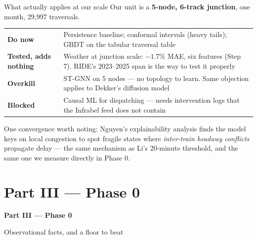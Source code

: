 \documentclass[aspectratio=169,10pt]{beamer}
\newcommand{\srcnote}[1]{{\scriptsize\color{ink3}#1}}
\begin{document}
\begin{frame}{What actually applies at our scale}
  Our unit is a \textbf{5-node, 6-track junction}, one month, 29{,}997 traversals.

  \vspace{0.8em}
  \centering
  \begin{tabular}{@{}p{4.1cm}p{8.3cm}@{}}
    \toprule
    \textbf{Do now} & Persistence baseline; conformal intervals (heavy tails);
      GBDT on the tabular traversal table \\
    \addlinespace
    \textbf{Tested, adds nothing} & Weather at junction scale: $-1.7\%$ MAE, six features
      (Step 7). RIDE's 2023--2025 span is the way to test it properly \\
    \addlinespace
    \textbf{Overkill} & ST-GNN on 5 nodes --- no topology to learn. Same objection applies to
      Dekker's diffusion model \\
    \addlinespace
    \textbf{Blocked} & Causal ML for dispatching --- needs intervention logs that the
      Infrabel feed does not contain \\
    \bottomrule
  \end{tabular}

  \vspace{1.2em}
  \raggedright
  \srcnote{One convergence worth noting: Nguyen's explainability analysis finds the model
  keys on local congestion to spot fragile states where \emph{inter-train headway conflicts}
  propagate delay --- the same mechanism as Li's 20-minute threshold, and the same one we
  measure directly in Phase 0.}
\end{frame}

\section{Part III --- Phase 0}
\begin{frame}[plain]
  \begin{center}\Large\textbf{Part III --- Phase 0}\end{center}
  \begin{center}\color{ink2}Observational facts, and a floor to beat\end{center}
\end{frame}
\end{document}
